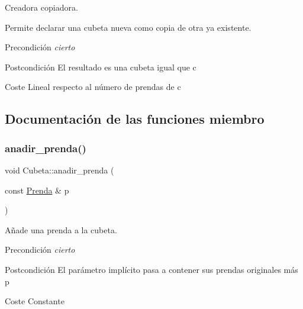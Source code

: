 Creadora copiadora. 

Permite declarar una cubeta nueva como copia de otra ya existente. \begin{DoxyPrecond}{Precondición}
{\itshape cierto} 
\end{DoxyPrecond}
\begin{DoxyPostcond}{Postcondición}
El resultado es una cubeta igual que c 
\end{DoxyPostcond}
\begin{DoxyParagraph}{Coste Lineal respecto al número de prendas de c}

\end{DoxyParagraph}


\subsection{Documentación de las funciones miembro}
\mbox{\label{class_cubeta_a431873df8f99cebe56b4787a5271e395}} 
\subsubsection{\texorpdfstring{anadir\+\_\+prenda()}{anadir\_prenda()}}
{\footnotesize\ttfamily void Cubeta\+::anadir\+\_\+prenda (\begin{DoxyParamCaption}\item[{const \mbox{\hyperlink{class_prenda}{Prenda}} \&}]{p }\end{DoxyParamCaption})}



Añade una prenda a la cubeta. 

\begin{DoxyPrecond}{Precondición}
{\itshape cierto} 
\end{DoxyPrecond}
\begin{DoxyPostcond}{Postcondición}
El parámetro implícito pasa a contener sus prendas originales más p 
\end{DoxyPostcond}
\begin{DoxyParagraph}{Coste Constante}

\end{DoxyParagraph}
\mbox{\label{class_cubeta_a60a5a4f4133ce02f1e4fe49bbe8b9ec7}} 
